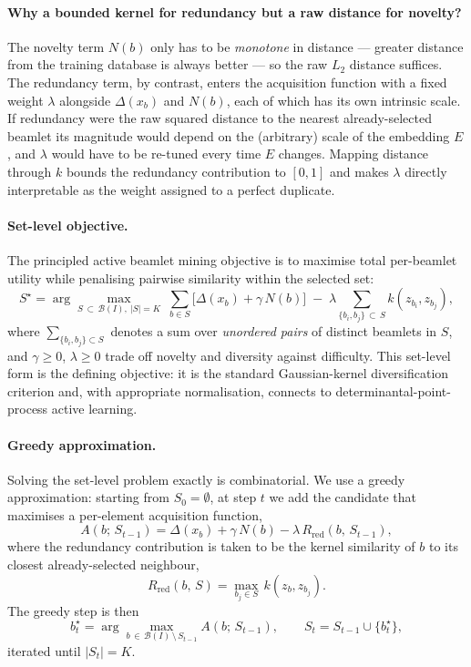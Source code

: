 \documentclass[11pt,a4paper]{article}
\begin{document}
\paragraph{Why a bounded kernel for redundancy but a raw distance for novelty?}
The novelty term \(N(b)\) only has to be \emph{monotone} in distance —
greater distance from the training database is always better — so the raw
\(L_2\) distance suffices.  The redundancy term, by contrast, enters the
acquisition function with a fixed weight \(\lambda\) alongside
\(\Delta(x_b)\) and \(N(b)\), each of which has its own intrinsic scale.
If redundancy were the raw squared distance to the nearest already-selected
beamlet its magnitude would depend on the (arbitrary) scale of the embedding
\(E\), and \(\lambda\) would have to be re-tuned every time \(E\) changes.
Mapping distance through \(k\) bounds the redundancy contribution to
\([0, 1]\) and makes \(\lambda\) directly interpretable as the weight
assigned to a perfect duplicate.

\paragraph{Set-level objective.}
The principled active beamlet mining objective is to maximise total
per-beamlet utility while penalising pairwise similarity within the
selected set:
\[
   S^\star
   = \arg\max_{S\, \subset\, \mathcal{B}(I),\ |S|=K}
     \;\sum_{b \in S}\bigl[\Delta(x_b) + \gamma\, N(b)\bigr]
     \;-\; \lambda\!\!\!\!\sum_{\{b_i, b_j\}\, \subset\, S}\!\!\!\!
              k(z_{b_i}, z_{b_j}),
\]
where \(\sum_{\{b_i,b_j\} \subset S}\) denotes a sum over \emph{unordered
pairs} of distinct beamlets in \(S\), and \(\gamma \geq 0\),
\(\lambda \geq 0\) trade off novelty and diversity against difficulty.
This set-level form is the defining objective: it is the standard
Gaussian-kernel diversification criterion and, with appropriate
normalisation, connects to determinantal-point-process active learning.

\paragraph{Greedy approximation.}
Solving the set-level problem exactly is combinatorial.  We use a greedy
approximation: starting from \(S_0 = \emptyset\), at step \(t\) we add the
candidate that maximises a per-element acquisition function,
\[
   A(b;\, S_{t-1})
   = \Delta(x_b) + \gamma\, N(b) - \lambda\, R_{\mathrm{red}}(b,\, S_{t-1}),
\]
where the redundancy contribution is taken to be the kernel similarity of
\(b\) to its closest already-selected neighbour,
\[
   R_{\mathrm{red}}(b,\, S)
   = \max_{b_j \in S}\, k(z_b, z_{b_j}).
\]
The greedy step is then
\[
   b_t^\star
   = \arg\max_{b\, \in\, \mathcal{B}(I)\, \setminus\, S_{t-1}}
     A(b;\, S_{t-1}),
   \qquad
   S_t = S_{t-1} \cup \{b_t^\star\},
\]
iterated until \(|S_t| = K\).
\end{document}
